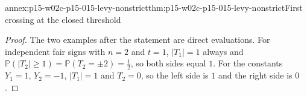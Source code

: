 \begin{annexitem}{annex:p15-w02c-p15-015-levy-nonstrict}{thm:p15-w02c-p15-015-levy-nonstrict}{First crossing at the closed threshold}
\begin{proof}
The two examples after the statement are direct evaluations. For
independent fair signs with \(n=2\) and \(t=1\), \(|T_1|=1\) always and
\(\mathbb P(|T_2|\geq1)=\mathbb P(T_2=\pm2)=\frac12\), so both sides equal
\(1\). For the constants \(Y_1=1\), \(Y_2=-1\), \(|T_1|=1\) and
\(T_2=0\), so the left side is \(1\) and the right side is \(0\).
\end{proof}
\end{annexitem}
